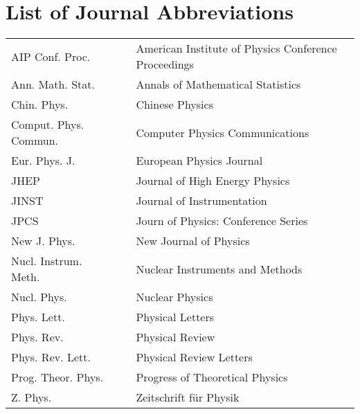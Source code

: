 
\chapter*{List of Journal Abbreviations}
\begin{center}
\begin{tabular}{lp{}p{}}
AIP Conf. Proc.      & \dotfill & American Institute of Physics Conference Proceedings\\
Ann. Math. Stat.     & \dotfill & Annals of Mathematical Statistics \\
Chin. Phys.          & \dotfill & Chinese Physics \\
Comput. Phys. Commun. & \dotfill & Computer Physics Communications \\
Eur. Phys. J.        & \dotfill & European Physics Journal \\
JHEP                 & \dotfill & Journal of High Energy Physics \\
JINST                & \dotfill & Journal of Instrumentation \\
JPCS                 & \dotfill & Journ of Physics: Conference Series \\
New J. Phys.         & \dotfill & New Journal of Physics \\
Nucl. Instrum. Meth. & \dotfill & Nuclear Instruments and Methods \\
Nucl. Phys.          & \dotfill & Nuclear Physics \\ 
Phys. Lett.          & \dotfill & Physical Letters \\
Phys. Rev.           & \dotfill & Physical Review \\
Phys. Rev. Lett.     & \dotfill & Physical Review Letters \\
Prog. Theor. Phys.   & \dotfill & Progress of Theoretical Physics \\
Z. Phys.             & \dotfill & Zeitschrift f{\"u}r Physik \\
\end{tabular}
\end{center}
